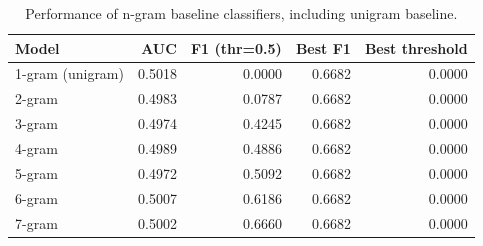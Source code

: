 \begin{table}
\caption{Performance of n-gram baseline classifiers, including unigram baseline.}
\label{tab:ngram_baselines}
\begin{tabular}{lrrrr}
\toprule
Model & AUC & F1 (thr=0.5) & Best F1 & Best threshold \\
\midrule
1-gram (unigram) & 0.5018 & 0.0000 & 0.6682 & 0.0000 \\
2-gram & 0.4983 & 0.0787 & 0.6682 & 0.0000 \\
3-gram & 0.4974 & 0.4245 & 0.6682 & 0.0000 \\
4-gram & 0.4989 & 0.4886 & 0.6682 & 0.0000 \\
5-gram & 0.4972 & 0.5092 & 0.6682 & 0.0000 \\
6-gram & 0.5007 & 0.6186 & 0.6682 & 0.0000 \\
7-gram & 0.5002 & 0.6660 & 0.6682 & 0.0000 \\
\bottomrule
\end{tabular}
\end{table}
